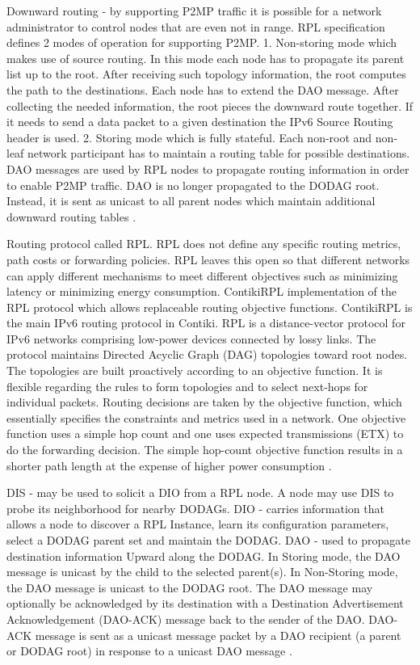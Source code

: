 	Downward routing - by supporting P2MP traffic it is possible for a network administrator to control nodes that are even not in range. RPL specification defines 2 modes of operation for supporting P2MP. 1. Non-storing mode which makes use of source routing. In this mode each node has to propagate its parent list up to the root. After receiving such topology information, the root computes the path to the destinations. Each node has to extend the DAO message. After collecting the needed information, the root pieces the downward route together. If it needs to send a data packet to a given destination the IPv6 Source Routing header is used.  2. Storing mode which is fully stateful. Each non-root and non-leaf network participant has to maintain a routing table for possible destinations. DAO messages are used by RPL nodes to propagate routing information in order to enable P2MP traffic. DAO is no longer propagated to the DODAG root. Instead, it is sent as unicast to all parent nodes which maintain additional downward routing tables \cite{tsvetkov2011rpl}.
	
Routing protocol called RPL. RPL does not define any specific routing metrics, path costs or forwarding policies. RPL leaves this open so that different networks can apply different mechanisms to meet different objectives such as minimizing latency or minimizing energy consumption.
	ContikiRPL implementation of the RPL protocol which allows replaceable routing objective functions. ContikiRPL is the main IPv6 routing protocol in Contiki. RPL is a distance-vector protocol for IPv6 networks comprising low-power devices connected by lossy links. The protocol maintains Directed Acyclic Graph (DAG) topologies toward root nodes. The topologies are built proactively according to an objective function. It is flexible regarding the rules to form topologies and to select next-hops for individual packets. Routing decisions are taken by the objective function, which essentially specifies the constraints and metrics used in a network. 
	One objective function uses a simple hop count and one uses expected transmissions (ETX) to do the forwarding decision. The simple hop-count objective function results in a shorter path length at the expense of higher power consumption \cite{tsiftes_framework_2010}.
	
DIS - may be used to solicit a DIO from a RPL node. A node may use DIS to probe its neighborhood for nearby DODAGs.
DIO - carries information that allows a node to discover a RPL Instance, learn its configuration parameters, select a DODAG parent set and maintain the DODAG.
DAO - used to propagate destination information Upward along the DODAG. In Storing mode, the DAO message is unicast by the child to the selected parent(s). In Non-Storing mode, the DAO message is unicast to the DODAG root. The DAO message may optionally be acknowledged by its destination with a Destination Advertisement Acknowledgement (DAO-ACK) message back to the sender of the DAO. DAO-ACK message is sent as a unicast message packet by a DAO recipient (a parent or DODAG root) in response to a unicast DAO message \cite{winter2012rpl}.

